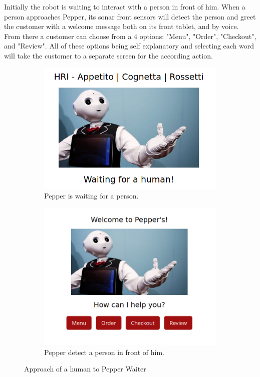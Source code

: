 \documentclass[12pt, letterpaper, twoside]{article}
\begin{document}
Initially the robot is waiting to interact with a person in front of him. When a person approaches Pepper, its sonar front sensors will detect the person and greet the customer with a welcome message both on its front tablet, and by voice. From there a customer can choose from a 4 options: "Menu", "Order", "Checkout", and "Review". All of these options being self explanatory and selecting each word will take the customer to a separate screen for the according action.  \\

\begin{figure}[h]
	\centering
	\begin{subfigure}{.5\textwidth}
	  \centering
	  \includegraphics[width=1\linewidth]{img/waiting_human.png}
	  \caption{Pepper is waiting for a person.}
	  \label{fig:wait_human}
	\end{subfigure}%
	\begin{subfigure}{.5\textwidth}
	  \centering
	  \includegraphics[width=.9\linewidth]{img/menu.png}
	  \caption{Pepper detect a person in front of him.}
	  \label{fig:human_arrived}
	\end{subfigure}
	\caption{Approach of a human to Pepper Waiter}
	\label{fig:approach_person}
\end{figure}
\end{document}
